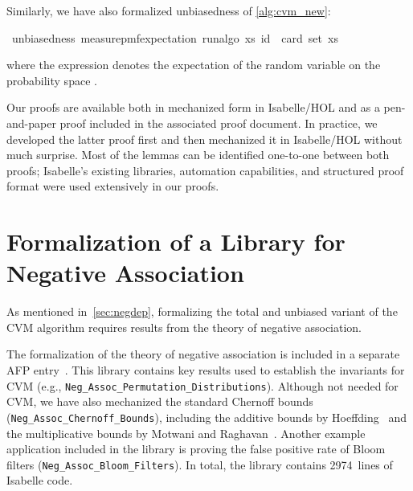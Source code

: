 \documentclass[a4paper,UKenglish,cleveref, autoref, thm-restate]{lipics-v2021}
\newenvironment{isabelle_cm}{\begin{mdframed}[backgroundcolor=shadecolor,nobreak=true,linewidth=0]\begin{isabelle}}{\end{isabelle}\end{mdframed}}%
\begin{document}
Similarly, we have also formalized unbiasedness of \cref{alg:cvm_new}:
\begin{isabelle_cm}
\isamarkupfalse%
\ unbiasedness{\isacharcolon}{\kern0pt}\ {\isacartoucheopen}measure{\isacharunderscore}{\kern0pt}pmf{\isachardot}{\kern0pt}expectation\ {\isacharparenleft}{\kern0pt}run{\isacharunderscore}{\kern0pt}algo\ xs{\isacharparenright}{\kern0pt}\ id\ {\isacharequal}{\kern0pt}\ card\ {\isacharparenleft}{\kern0pt}set\ xs{\isacharparenright}{\kern0pt}{\isacartoucheclose}
\end{isabelle_cm}
where the expression  denotes the expectation of the random variable  on the probability space .

Our proofs are available both in mechanized form in Isabelle/HOL and as a pen-and-paper proof included in the associated proof document.
In practice, we developed the latter proof first and then mechanized it in Isabelle/HOL without much surprise.
Most of the lemmas can be identified one-to-one between both proofs; Isabelle's existing libraries, automation capabilities, and structured proof format were used extensively in our proofs.

\section{Formalization of a Library for Negative Association}\label{sec:formalization_neg_dep}
As mentioned in~\cref{sec:negdep}, formalizing the total and unbiased variant of the CVM algorithm requires results from the theory of negative association.

\begin{note}
The formalization of the theory of negative association is included in a separate AFP entry~\cite{Negative_Association-AFP}.
This library contains key results used to establish the invariants for CVM (e.g., \verb|Neg_Assoc_Permutation_Distributions|).
Although not needed for CVM, we have also mechanized the standard Chernoff bounds (\verb|Neg_Assoc_Chernoff_Bounds|), including the additive bounds by Hoeffding~\cite[Th. 1, 2]{hoeffding1963} and the multiplicative bounds by Motwani and Raghavan~\cite[Th. 4.1, 4.2]{motwani1995}.
Another example application included in the library is proving the false positive rate of Bloom filters (\verb|Neg_Assoc_Bloom_Filters|).
In total, the library contains 2974~lines of Isabelle code.
\lipicsEnd\end{note}
\end{document}
